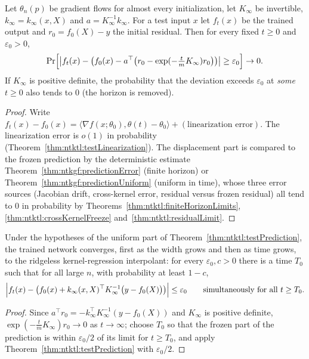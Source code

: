 \begin{theorem}\label{thm:ntktl:testPrediction}
  \leanok
Let $\theta_n(p)$ be gradient flows for almost every initialization, let $K_\infty$ be invertible, $k_\infty=k_\infty(x,X)$ and $a=K_\infty^{-1}k_\infty$. For a test input $x$ let $f_t(x)$ be the trained output and $r_0=f_0(X)-y$ the initial residual. Then for every fixed $t\ge0$ and $\varepsilon_0>0$,
\[
  \Pr\Bigl[\bigl|f_t(x)-\bigl(f_0(x)-a^\top\bigl(r_0-\exp(-\tfrac tmK_\infty)r_0\bigr)\bigr)\bigr|\ge\varepsilon_0\Bigr]\to0.
\]
If $K_\infty$ is positive definite, the probability that the deviation exceeds $\varepsilon_0$ at \emph{some} $t\ge0$ also tends to $0$ (the horizon is removed).
\end{theorem}

\begin{proof}
  \leanok
Write $f_t(x)-f_0(x)=\langle\nabla f(x;\theta_0),\theta(t)-\theta_0\rangle+(\text{linearization error})$. The linearization error is $o(1)$ in probability (Theorem~\ref{thm:ntktl:testLinearization}). The displacement part is compared to the frozen prediction by the deterministic estimate Theorem~\ref{thm:ntkgf:predictionError} (finite horizon)
or Theorem~\ref{thm:ntkgf:predictionUniform} (uniform in time), whose three error sources (Jacobian drift, cross-kernel error, residual versus frozen residual) all tend to $0$ in probability by Theorems~\ref{thm:ntktl:finiteHorizonLimits}, \ref{thm:ntktl:crossKernelFreeze} and~\ref{thm:ntktl:residualLimit}.
\end{proof}

\begin{theorem}\label{thm:ntktl:interpolation}
  \leanok
Under the hypotheses of the uniform part of Theorem~\ref{thm:ntktl:testPrediction}, the trained network converges, first as the width grows and then as time grows, to the ridgeless kernel-regression interpolant: for every $\varepsilon_0,c>0$ there is a time $T_0$ such that for all large $n$, with probability at least $1-c$,
\[
  \Bigl|f_t(x)-\bigl(f_0(x)+k_\infty(x,X)^\top K_\infty^{-1}\bigl(y-f_0(X)\bigr)\bigr)\Bigr|\le\varepsilon_0\qquad\text{simultaneously for all }t\ge T_0 .
\]
\end{theorem}

\begin{proof}
  \leanok
Since $a^\top r_0=-k_\infty^\top K_\infty^{-1}(y-f_0(X))$ and $K_\infty$ is positive definite, $\exp(-\frac tmK_\infty)r_0\to0$ as $t\to\infty$; choose $T_0$ so that the frozen part of the prediction is within $\varepsilon_0/2$ of its limit for $t\ge T_0$, and apply Theorem~\ref{thm:ntktl:testPrediction} with $\varepsilon_0/2$.
\end{proof}
